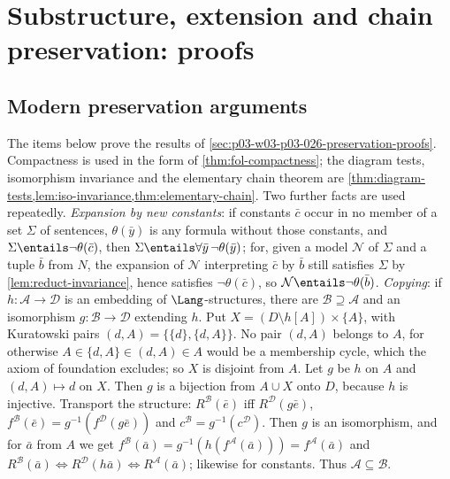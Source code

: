 \section{Substructure, extension and chain preservation: proofs}
\label{sec:annex-p03-w03-p03-026}

\subsection{Modern preservation arguments}
\label{sec:annex-p03-w03-p03-026-modern}

The items below prove the results of
\cref{sec:p03-w03-p03-026-preservation-proofs}.  Compactness is used in the
form of \cref{thm:fol-compactness}; the diagram tests, isomorphism
invariance and the elementary chain theorem are
\cref{thm:diagram-tests,lem:iso-invariance,thm:elementary-chain}.
Two further facts are used repeatedly.  \emph{Expansion by new constants}:
if constants \(\bar c\) occur in no member of a set \(\Sigma\) of sentences,
\(\theta(\bar y)\) is any formula without those constants, and
\(\Sigma\entails\neg\theta(\bar c)\), then
\(\Sigma\entails\forall\bar y\,\neg\theta(\bar y)\); for, given a model
\(\mathcal N\) of \(\Sigma\) and a tuple \(\bar b\) from \(N\), the expansion
of \(\mathcal N\) interpreting \(\bar c\) by \(\bar b\) still satisfies
\(\Sigma\) by \cref{lem:reduct-invariance}, hence satisfies
\(\neg\theta(\bar c)\), so \(\mathcal N\entails\neg\theta(\bar b)\).
\emph{Copying}: if \(h:\mathcal A\to\mathcal D\) is an embedding of
\(\Lang\)-structures, there are \(\mathcal B\supseteq\mathcal A\) and an
isomorphism \(g:\mathcal B\to\mathcal D\) extending \(h\).  Put
\(X=(D\setminus h[A])\times\{A\}\), with Kuratowski pairs
\((d,A)=\{\{d\},\{d,A\}\}\).  No pair \((d,A)\) belongs to \(A\), for
otherwise \(A\in\{d,A\}\in(d,A)\in A\) would be a membership cycle, which
the axiom of foundation excludes; so \(X\)
is disjoint from \(A\).  Let \(g\) be \(h\) on \(A\) and \((d,A)\mapsto d\)
on \(X\).  Then \(g\) is a bijection from \(A\cup X\) onto \(D\), because
\(h\) is injective.  Transport the structure: \(R^{\mathcal B}(\bar e)\) iff
\(R^{\mathcal D}(g\bar e)\), \(f^{\mathcal B}(\bar e)=g^{-1}(f^{\mathcal
D}(g\bar e))\) and \(c^{\mathcal B}=g^{-1}(c^{\mathcal D})\).  Then \(g\) is
an isomorphism, and for \(\bar a\) from \(A\) we get
\(f^{\mathcal B}(\bar a)=g^{-1}(h(f^{\mathcal A}(\bar a)))=f^{\mathcal A}(\bar a)\)
and \(R^{\mathcal B}(\bar a)\iff R^{\mathcal D}(h\bar a)\iff R^{\mathcal A}(\bar a)\);
likewise for constants.  Thus \(\mathcal A\subseteq\mathcal B\).

